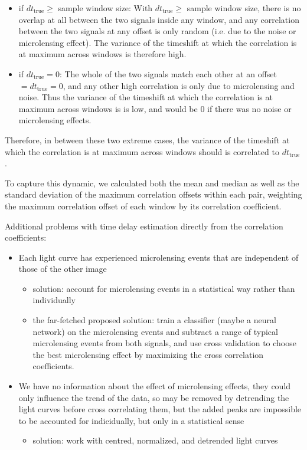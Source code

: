 \documentclass[a4paper, 11pt]{article}
\begin{document}
\begin{itemize}
  \item if $dt_\mathrm{true} \geq$ sample window size: With $dt_\mathrm{true} \geq$ sample window size, there is no overlap at all between the two signals inside any window, and any correlation between the two signals at any offset is only random (i.e. due to the noise or microlensing effect). The variance of the timeshift at which the correlation is at maximum across windows is therefore high.
  \item if $dt_\mathrm{true} = 0$: The whole of the two signals match each other at an offset $ = dt_\mathrm{true} = 0$, and any other high correlation is only due to microlensing and noise. Thus the variance of the timeshift at which the correlation is at maximum across windows is is low, and would be 0 if there was no noise or microlensing effects.
\end{itemize}

Therefore, in between these two extreme cases, the variance of the timeshift at which the correlation is at maximum across windows should is correlated to $dt_\mathrm{true}$.

To capture this dynamic, we calculated both the mean and median as well as the standard deviation of the maximum correlation offsets within each pair, weighting the maximum correlation offset of each window by its correlation coefficient.

Additional problems with time delay estimation directly from the correlation coefficients:

\begin{itemize}
  \item Each light curve has experienced microlensing events that are independent of those of the other image
  \begin{itemize}
    \item solution: account for microlensing events in a statistical way rather than individually 
    \item the far-fetched proposed solution: train a classifier (maybe a neural network) on the microlensing events and subtract a range of typical microlensing events from both signals, and use cross validation to choose the best microlensing effect by maximizing the cross correlation coefficients.
  \end{itemize}
  \item We have no information about the effect of microlensing effects, they could only influence the trend of the data, so may be removed by detrending the light curves before cross correlating them, but the added peaks are impossible to be accounted for indicidually, but only in a statistical sense
  \begin{itemize}
    \item solution: work with centred, normalized, and detrended light curves
  \end{itemize}
\end{itemize}
\end{document}
